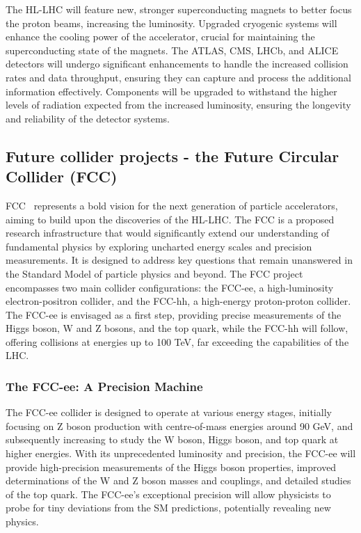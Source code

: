         The HL-LHC will feature new, stronger superconducting magnets to better focus the proton beams, increasing the luminosity.
        Upgraded cryogenic systems will enhance the cooling power of the accelerator, crucial for maintaining the superconducting state of the magnets.
        The ATLAS, CMS, LHCb, and ALICE detectors will undergo significant enhancements to handle the increased collision 
        rates and data throughput, ensuring they can capture and process the additional information effectively.
        Components will be upgraded to withstand the higher levels of radiation expected from the increased luminosity, 
        ensuring the longevity and reliability of the detector systems.
    
    \subsection{Future collider projects - the Future Circular Collider (FCC)}
        FCC~\cite{Benedikt2020} represents 
        a bold vision for the next generation of particle accelerators, aiming to 
        build upon the discoveries of the HL-LHC. The FCC is a proposed research 
        infrastructure that would significantly extend our understanding of 
        fundamental physics by exploring uncharted energy scales and precision 
        measurements. It is designed to address key questions that remain unanswered 
        in the Standard Model of particle physics and beyond.
        The FCC project encompasses two main collider configurations: the FCC-ee, 
        a high-luminosity electron-positron collider, and the FCC-hh, a high-energy 
        proton-proton collider. The FCC-ee is envisaged as a first step, providing 
        precise measurements of the Higgs boson, W and Z bosons, and the top quark, 
        while the FCC-hh will follow, offering collisions at energies up to 100 TeV, 
        far exceeding the capabilities of the LHC.
        \subsubsection{The FCC-ee: A Precision Machine}
        The FCC-ee collider is designed to operate at various energy stages, initially 
        focusing on Z boson production with centre-of-mass energies around 90 GeV, 
        and subsequently increasing to study the W boson, Higgs boson, and top quark 
        at higher energies. With its unprecedented luminosity and precision, the FCC-ee 
        will provide high-precision measurements of the Higgs boson properties, 
        improved determinations of the W and Z boson masses and couplings, and detailed studies of
        the top quark. The FCC-ee's exceptional precision will allow physicists to probe 
        for tiny deviations from the SM predictions, potentially revealing 
        new physics.
